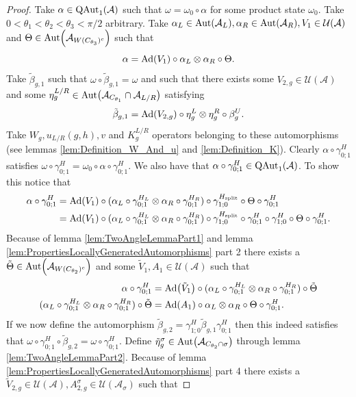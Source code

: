 \documentclass[12pt,a4paper,twoside]{article}
\let\originalleft\left
\let\originalright\right
\renewcommand{\left}{\mathopen{}\mathclose\bgroup\originalleft}
\renewcommand{\right}{\aftergroup\egroup\originalright}
\newcommand{\UU}{\mathcal U}
\renewcommand{\AA}{\mathcal A}
\newcommand{\Ad}[1]{\textrm{Ad}\left(#1\right)}
\newcommand{\Aut}[1]{\textrm{Aut}\left(#1\right)}
\newcommand{\QAut}[1]{\textrm{QAut}_1\left(#1\right)}
\theoremstyle{definition}
\numberwithin{equation}{section}
\begin{document}
\begin{proof}
	Take $\alpha\in\QAut{\AA}$ such that $\omega=\omega_0\circ\alpha$ for some product state $\omega_0$. Take $0<\theta_1<\theta_2<\theta_3<\pi/2$ arbitrary. Take $\alpha_L\in\Aut{\AA_L},\alpha_R\in\Aut{\AA_R},V_1\in\UU(\AA)$ and $\Theta\in\Aut{\AA_{W(C_{\theta_3})^c}}$ such that
	\begin{equation}
		\alpha=\Ad{V_1}\circ\alpha_L\otimes\alpha_R\circ\Theta.
	\end{equation}
	Take $\tilde{\beta}_{g,1}$ such that $\omega\circ\tilde{\beta}_{g,1}=\omega$ and such that there exists some $V_{2,g}\in\UU(\AA)$ and some $\eta_g^{L/R}\in\Aut{\AA_{C_{\theta_1}}\cap\AA_{L/R}}$ satisfying
	\begin{equation}
		\tilde{\beta}_{g,1}=\Ad{V_{2,g}}\circ\eta_{g}^L\otimes\eta_{g}^R\circ\beta_g^U.
	\end{equation}
	Take $W_g,u_{L/R}(g,h),v$ and $K_g^{L/R}$ operators belonging to these automorphisms (see lemmas \ref{lem:Definition_W_And_u} and \ref{lem:Definition_K}). Clearly $\alpha\circ\gamma^H_{0;1}$ satisfies $\omega\circ\gamma^{H}_{0;1}=\omega_0\circ\alpha\circ\gamma^{H}_{0;1}$. We also have that $\alpha\circ\gamma^{H}_{0;1}\in\QAut{\AA}$. To show this notice that
	\begin{align}
		\alpha\circ\gamma^{H}_{0;1}&=\Ad{V_1}\circ(\alpha_L\circ\gamma^{H_L}_{0;1}\otimes\alpha_R\circ\gamma^{H_R}_{0;1})\circ\gamma^{H_\text{split}}_{1;0}\circ\Theta\circ\gamma^H_{0;1}\\
		&=\Ad{V_1}\circ(\alpha_L\circ\gamma^{H_L}_{0;1}\otimes\alpha_R\circ\gamma^{H_R}_{0;1})\circ\gamma^{H_\text{split}}_{1;0}\circ\gamma^{H}_{0;1}\circ\gamma^{H}_{1;0}\circ\Theta\circ\gamma^H_{0;1}.
	\end{align}
	Because of lemma \ref{lem:TwoAngleLemmaPart1} and lemma \ref{lem:PropertiesLocallyGeneratedAutomorphisms} part 2 there exists a $\tilde{\Theta}\in\Aut{\AA_{W(C_{\theta_2})^c}}$ and some $\tilde V_1,A_1\in\UU(\AA)$ such that
	\begin{align}
		\alpha\circ\gamma^H_{0;1}&=\Ad{\tilde V_1}\circ(\alpha_L\circ\gamma^{H_L}_{0;1}\otimes\alpha_R\circ\gamma^{H_R}_{0;1})\circ\tilde\Theta\\
		\label{eq:ProofThatTheH2IndexIsInvariantUnderLGA's_Definition_A1}
		(\alpha_L\circ\gamma^{H_L}_{0;1}\otimes\alpha_R\circ\gamma^{H_R}_{0;1})\circ\tilde\Theta&=\Ad{A_1}\circ \alpha_L\otimes\alpha_R\circ\Theta\circ\gamma^{H}_{0;1}.
	\end{align}
	If we now define the automorphism $\tilde{\beta}_{g,2}=\gamma^{H}_{1;0}\tilde\beta_{g,1}\gamma^{H}_{0;1}$ then this indeed satisfies that $\omega\circ\gamma^{H}_{0;1}\circ\tilde{\beta}_{g,2}=\omega\circ\gamma^{H}_{0;1}$. Define $\tilde\eta_g^\sigma\in\Aut{\AA_{C_{\theta_2}\cap\sigma}}$ through lemma \ref{lem:TwoAngleLemmaPart2}. Because of lemma \ref{lem:PropertiesLocallyGeneratedAutomorphisms} part 4 there exists a $\tilde V_{2,g}\in\UU(\AA),A_{2,g}^{\sigma}\in\UU(\AA_\sigma)$ such that

\end{proof}
\end{document}
